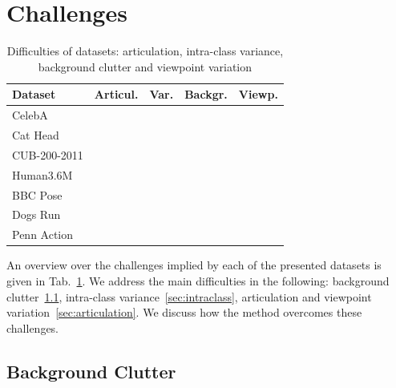 \section{Challenges}\label{sec:challenges}
	\begin{table}
		\centering
		\caption{Difficulties of datasets: articulation, intra-class variance, background clutter and viewpoint variation}
		\label{tab:challenges}
		\begin{tabular}{l|rrrr}
			\hline
			Dataset &  Articul.& Var. &  Backgr.& Viewp.  \\ \hline
			CelebA &   &  &  &    \\
			Cat Head & &  \checkmark&  &   \\
			CUB-200-2011 & & \checkmark& \checkmark&   \\
			Human3.6M &\checkmark& &  & \checkmark  \\
			BBC Pose &  \checkmark&  & \checkmark&  \\
			Dogs Run & \checkmark& \checkmark& \checkmark&   \\
			Penn Action & \checkmark& \checkmark& \checkmark& \checkmark  \\
			\hline
		\end{tabular}
	\end{table}
	An overview over the challenges implied by each of the presented datasets is given in Tab.~\ref{tab:challenges}. We address the main difficulties in the following: background clutter~\ref{sec:background}, intra-class variance~\ref{sec:intraclass}, articulation and viewpoint variation~\ref{sec:articulation}.
	We discuss how the method overcomes these challenges.

	\subsection{Background Clutter}\label{sec:background}


